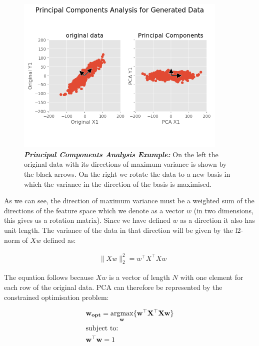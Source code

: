 \begin{figure}
    \centering
    \includegraphics[width=0.9\textwidth]{chapters/2_background/PCA.png}
    \caption[Principal Components Analysis Example]{\textit{\textbf{Principal Components Analysis Example:}} On the left the original data with its directions of maximum variance is shown by the black arrows. On the right we rotate the data to a new basis in which the variance in the direction of the basis is maximised.}\label{fig:PCA}
\end{figure}

As we can see, the direction of maximum variance must be a weighted sum of the directions of the feature space which we denote as a vector $w$ (in two dimensions, this gives us a rotation matrix). Since we have defined $w$ as a direction it also has unit length. The variance of the data in that direction will be given by the l2-norm of $Xw$ defined as:

\begin{align}
     & \|Xw\|^2_2=w^{\top}X^{\top}Xw
\end{align}

The equation follows because $Xw$ is a vector of length $N$ with one element for each row of the original data. PCA can therefore be represented by the constrained optimisation problem:

\begin{align}
     & \mathbf{w_{opt}}=\underset{\mathbf{w}}{\mathrm{argmax}}\{\mathbf{w^{\top}X^{\top}}\mathbf{Xw}\} \\
     & \text{subject to:} \notag                                                                       \\
     & \mathbf{w^{\top}w}=1 \notag
\end{align}

